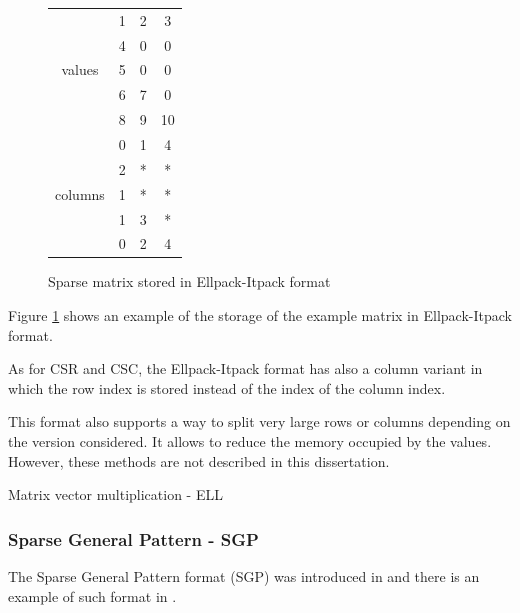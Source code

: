 \begin{figure}[h]
\centering
\begin{tabular}{c|ccc|}
	\cline{2-4}
	\multirow{5}{*}{values}  & 1 & 2 & 3  \\
	                         & 4 & 0 & 0  \\
	                         & 5 & 0 & 0  \\
	                         & 6 & 7 & 0  \\
	                         & 8 & 9 & 10 \\ \cline{2-4}
	\multirow{5}{*}{columns} & 0 & 1 & 4  \\
	                         & 2 & * & *  \\
	                         & 1 & * & *  \\
	                         & 1 & 3 & *  \\
	                         & 0 & 2 & 4  \\ \cline{2-4}
\end{tabular}
\caption{Sparse matrix stored in Ellpack-Itpack format \label{fig:methods:ell_ex}}
\end{figure}

Figure \ref{fig:methods:ell_ex} shows an example of the storage of the example matrix in Ellpack-Itpack format.

As for CSR and CSC, the Ellpack-Itpack format has also a column variant in which the row index is stored instead of the index of the column index.

This format also supports a way to split very large rows or columns depending on the version considered.
It allows to reduce the memory occupied by the values.
However, these methods are not described in this dissertation.

\begin{algorithm}[h]
	\DontPrintSemicolon
	\caption{Matrix vector multiplication - ELL\label{fig:methods:ell_algo}}
\end{algorithm}

\subsubsection{Sparse General Pattern - SGP}
The Sparse General Pattern format (SGP) was introduced in \cite{Petit1991} and there is an example of such format in \cite{PetiE1996}.

